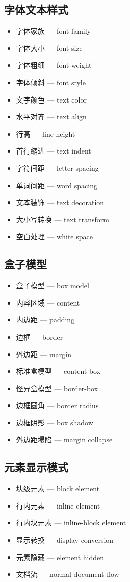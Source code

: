 \subsection{字体文本样式}
\begin{itemize}
\item 字体家族 — font family
\item 字体大小 — font size
\item 字体粗细 — font weight
\item 字体倾斜 — font style
\item 文字颜色 — text color
\item 水平对齐 — text align
\item 行高 — line height
\item 首行缩进 — text indent
\item 字符间距 — letter spacing
\item 单词间距 — word spacing
\item 文本装饰 — text decoration
\item 大小写转换 — text transform
\item 空白处理 — white space
\end{itemize}

\subsection{盒子模型}
\begin{itemize}
\item 盒子模型 — box model
\item 内容区域 — content
\item 内边距 — padding
\item 边框 — border
\item 外边距 — margin
\item 标准盒模型 — content-box
\item 怪异盒模型 — border-box
\item 边框圆角 — border radius
\item 边框阴影 — box shadow
\item 外边距塌陷 — margin collapse
\end{itemize}

\subsection{元素显示模式}
\begin{itemize}
\item 块级元素 — block element
\item 行内元素 — inline element
\item 行内块元素 — inline-block element
\item 显示转换 — display conversion
\item 元素隐藏 — element hidden
\item 文档流 — normal document flow
\end{itemize}

